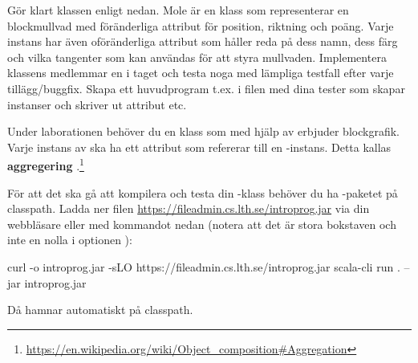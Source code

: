 \Subtask Gör klart klassen  enligt nedan. Mole är en klass som representerar en blockmullvad med föränderliga attribut för position, riktning och poäng. Varje instans har även oföränderliga attribut som håller reda på dess namn, dess färg och vilka tangenter som kan användas för att styra mullvaden. Implementera klassens medlemmar en i taget och testa noga med lämpliga testfall efter varje tillägg/buggfix. Skapa ett huvudprogram t.ex. i filen  med dina tester som skapar instanser och skriver ut attribut etc. 
%
%
%
%
%



\Subtask Under laborationen behöver du en klass  som med hjälp av  erbjuder blockgrafik. Varje instans av  ska ha ett attribut som refererar till en -instans. Detta kallas \textbf{aggregering} .\footnote{\url{https://en.wikipedia.org/wiki/Object\_composition\#Aggregation}}

För att det ska gå att kompilera och testa din -klass behöver du ha -paketet på classpath. Ladda ner filen \url{https://fileadmin.cs.lth.se/introprog.jar} via din webbläsare eller med kommandot  nedan (notera att det är stora bokstaven  och inte en nolla i optionen ):

\begin{REPLnonum}
curl -o introprog.jar -sLO  https://fileadmin.cs.lth.se/introprog.jar
scala-cli run . --jar introprog.jar
\end{REPLnonum}
Då hamnar  automatiskt på classpath. 

